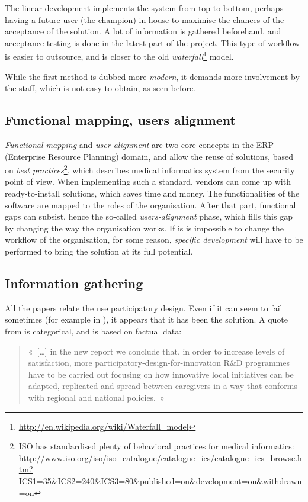 \documentclass[a4paper,10pt]{article}
\begin{document}
\begin{multicols}{2}
The linear development implements the system from top to bottom, perhaps having
a future user (the champion) in-house to maximise the chances of the acceptance
of the solution. A lot of information is gathered beforehand, and acceptance
testing is done in the latest part of the project. This type of workflow is easier to
outsource, and is closer to the old
\emph{waterfall}\footnote{\url{http://en.wikipedia.org/wiki/Waterfall\_model}} model.

While the first method is dubbed more \emph{modern}, it demands more involvement
by the staff, which is not easy to obtain, as seen before.

\subsection{Functional mapping, users alignment}
\label{mapping}

\emph{Functional mapping} and \emph{user alignment} are two core concepts in the
ERP (Enterprise Resource Planning) domain, and allow the reuse of solutions,
based on \emph{best practices}\footnote{ISO has standardised plenty of
behavioral practices for medical informatics:
\url{http://www.iso.org/iso/iso_catalogue/catalogue_ics/catalogue_ics_browse.htm?ICS1=35&ICS2=240&ICS3=80&published=on&development=on&withdrawn=on}},
which describes medical informatics system from the security point of view. When
implementing such a standard, vendors can come up with ready-to-install
solutions, which saves time and money. The functionalities of the software are
mapped to the roles of the organisation.  After that part, functional gaps can
subsist, hence the so-called \emph{users-alignment} phase, which fills this gap
by changing the way the organisation works. If is is impossible to change the
workflow of the organisation, for some reason, \emph{specific development} will
have to be performed to bring the solution at its full potential.

\subsection{Information gathering}

All the papers relate the use participatory design. Even if it can seem to fail
sometimes (for example in \cite{Hasvold2011}), it appears that it has been the
solution. A quote from \cite{UsersAward2} is categorical, and is based on factual
data:

\begin{quote}
«~[…] in the new report we conclude that, in order to increase levels of
satisfaction, more participatory-design-for-innovation R\&D programmes have to be
carried out focusing on how innovative local initiatives can be adapted,
replicated and spread between caregivers in a way that conforms with regional
and national policies.~»
\end{quote}


\end{multicols}
\end{document}
